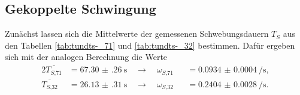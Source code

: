 \subsection{Gekoppelte Schwingung}
Zunächst lassen sich die Mittelwerte der gemessenen Schwebungsdauern $T_{S}$ aus den Tabellen \ref{tab:tundts-_71} und \ref{tab:tundts-_32} bestimmen.
Dafür ergeben sich mit der analogen Berechnung die Werte
\begin{alignat*}{2}
    \overline{T_{S\text{,}71}} &= \SI{67.30(26)}{\second} \quad \to \quad \omega_{S\text{,}71} &&= \SI{0.0934(4)}{\per\second}, \\
    \overline{T_{S\text{,}32}} &= \SI{26.13(31)}{\second}\quad \to \quad \omega_{S\text{,}32} &&= \SI{0.2404(28)}{\per\second}. 
\end{alignat*}
